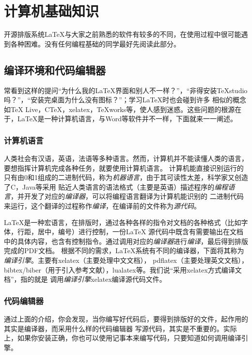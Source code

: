 \section{计算机基础知识}


开源排版系统\LaTeX{}与大家之前熟悉的软件有较多的不同，在使用过程中很可能遇到各种困难。没有任何编程基础的同学最好先阅读此部分。
\subsection{编译环境和代码编辑器}
常看到这样的提问“为什么我的\LaTeX{}界面和别人不一样？”，“非得安装TeXstudio吗？”，“安装完桌面为什么没有图标？”；学习LaTeX时也会碰到许多
相似的概念如\TeX{} Live，C\TeX{}，xelatex，TeXworks等，使人感到迷惑。这些问题的根源在于，\LaTeX{}是一种计算机语言，与Word等软件并不一样，下面就来一一阐述。



\subsubsection{计算机语言}

人类社会有汉语，英语，法语等多种语言。然而，计算机并不能读懂人类的语言，要想指挥计算机完成各种任务，就要使用计算机语言。
计算机能直接识别运行的只有由0和1组成的二进制代码，称为\emph{机器语言}，由于其可读性太差，科学家又创造了C，Java等采用
贴近人类语言的语法格式（主要是英语）描述程序的\emph{编程语言}，并开发了对应的\emph{编译器}，可以将编程语言翻译为计算机能识别的
二进制代码来运行，这个翻译的过程称作\emph{编译}，在编译前的文件称为\emph{源代码}。

\LaTeX{}是一种宏语言，在排版时，通过各种各样的指令对文档的各种格式（比如字体，行距，居中，编号）进行控制，一份\LaTeX{}
源代码中既含有需要输出在文档中的具体内容，也含有控制指令。通过调用对应的\emph{编译器}进行\emph{编译}，最后得到排版完成的PDF文档。
根据不同的需求，\LaTeX{}系统有不同的编译器，下面将其称为\emph{编译引擎}。主要有xelatex（主要处理中文文档），
pdflatex（主要处理英文文档），bibtex/biber（用于引入参考文献），lualatex等。我们说“采用xelatex方式编译文档”，指的就是
调用\emph{编译引擎}xelatex编译源代码文件。




\subsubsection{代码编辑器}


通过上面的介绍，你会发现，当你编写好代码后，要得到排版好的文件，起作用的其实是编译器，而采用什么样的代码编辑器
写源代码，其实是不重要的。实际上，如果你安装正确，你也可以使用记事本来编写代码，只要知道如何调用编译引擎。

